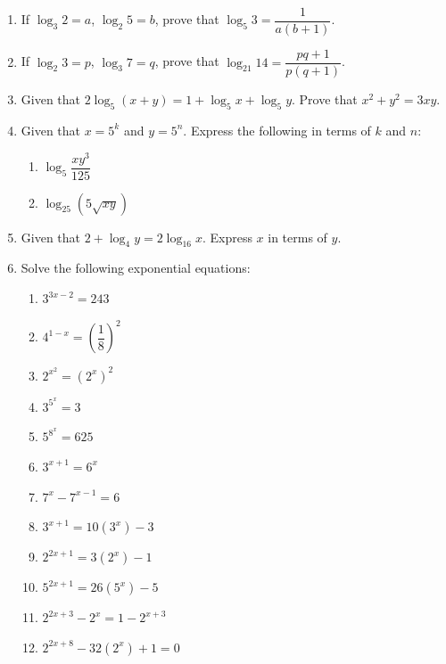 \documentclass[12pt]{report}
\begin{document}
\begin{multicols}{2}
\begin{enumerate}
        \item If $\log_3 2 = a$, $\log_2 5 = b$, prove that $\log_5 3 = \dfrac{1}{a(b+1)}$.
        \item If $\log_2 3 = p$, $\log_3 7 = q$, prove that $\log_21 14 =
                  \dfrac{pq+1}{p(q+1)}$.
        \item Given that $2\log_5(x+y) = 1 + \log_5 x + \log_5 y$. Prove that $x^2 + y^2 =
                  3xy$.
        \item Given that $x = 5^k$ and $y = 5^n$. Express the following in terms of $k$ and
              $n$:
              \begin{enumerate}
                  \item $\log_{5}{\dfrac{xy^3}{125}}$
                  \item $\log_{25}\left(5{\sqrt{xy}}\right)$
              \end{enumerate}

        \item Given that $2 + \log_4 y = 2\log_16 x$. Express $x$ in terms of $y$.

        \item Solve the following exponential equations:
              \begin{enumerate}
                  \item $3^{3x-2}=243$
                  \item $4^{1-x}=\left({\dfrac{1}{8}}\right)^{2}$
                  \item $2^{x^{2}}=\left(2^{x}\right)^{2}$
                  \item $3^{5^x}=3$
                  \item $5^{8^x}=625$
                  \item $3^{x+1}=6^{x}$
                  \item $7^{x}-7^{x-1}=6$
                  \item $3^{x+1}=10\left(3^x\right)-3$
                  \item $2^{2x+1}=3\left(2^{x}\right)-1$
                  \item $5^{2x+1}=26\left(5^{x}\right)-5$
                  \item $2^{2x+3}-2^{x}=1-2^{x+3}$
                  \item $2^{2x+8}-32\left(2^{x}\right)+1=0$
              \end{enumerate}


\end{enumerate}
\end{multicols}
\end{document}
